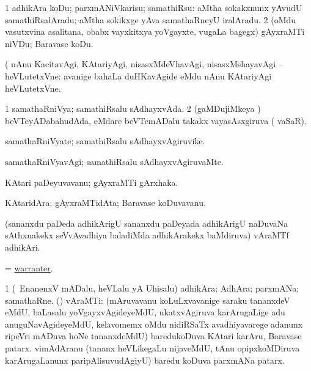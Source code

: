 \bentry
{} 
\gl{\sakirx}
\expl{}
\bmng
\bnum
\num{1} adhikAra koDu; parxmANiVkarisu; samathiRsu:  aMtha sokakxnunx yAvudU samathiRsalAradu; aMtha sokikxge yAva samathaRneyU iralAradu. 
\num{2} (oMdu vasutxvina asalitana, obabx vayxkitxya yoVgayxte, \mo vugaLa bagegx) gAyxraMTi niVDu; Baravase koDu. 
\enum
\emng

\noindent 
\gl{\pagu}
\expl{}
\bmng
{} (  nAnu KacitavAgi, KAtariyAgi, nisasxMdeVhavAgi, nisasxMshayavAgi -- heVLutetxVne:  avanige bahaLa duHKavAgide eMdu nAnu KAtariyAgi heVLutetxVne. 
\emng
\eentry

\bentry
{} 
\gl{\gu}
\expl{}
\bmng
\bnum
\num{1} samathaRniVya; samathiRsalu sAdhayxvAda. 
\num{2} (gaMDujiMkeya \vi) beVTeyADabahudAda, eMdare beVTemADalu takakx vayasAsxgiruva ( vaSaR). 
\enum
\emng
\eentry

\bentry
{} 
\gl{\nA}
\expl{}
\bmng
samathaRniVyate; samathiRsalu sAdhayxvAgiruvike. 
\emng
\eentry

\bentry
{} 
\gl{\kirxvi}
\expl{}
\bmng
samathaRniVyavAgi; samathiRsalu sAdhayxvAgiruvaMte. 
\emng
\eentry

\bentry
{} 
\gl{\nA}
\expl{}
\bmng
KAtari paDeyuvavanu; gAyxraMTi gArxhaka. 
\emng
\eentry

\bentry
{} 
\gl{\nA}
\expl{}
\bmng
KAtaridAra; gAyxraMTidAta; Baravase koDuvavanu. 
\emng
\eentry

\bentry
{} 
\gl{\nA}
\expl{}
\bmng
(sananxdu paDeda adhikArigU sananxdu paDeyada adhikArigU naDuvaNa sAthxnakekx seVvAvadhiya baladiMda adhikArakekx baMdiruva) vAraMTf adhikAri. 
\emng
\eentry

\bentry
{} 
\gl{\nA}
\expl{}
\bmng
= \hyperlink{warranter}{warranter}. 
\emng
\eentry

\bentry
{} 
\gl{\nA}
\bmng
\bnum
\num{1} (\sA\ EnanenxV mADalu, heVLalu yA Uhisalu) adhikAra; AdhAra; parxmANa; samathaRne. 
 (\nAyxshA) vAraMTi: 
\banum
{} (mAruvavanu koLuLxvavanige saraku tananxdeV eMdU, baLasalu yoVgayxvAgideyeMdU, ukatxvAgiruva karArugaLige adu anuguNavAgideyeMdU, kelavomemx oMdu nidiRSaTx avadhiyavarege adanunx ripeVri mADuva hoNe tananxdeMdU) baredukoDuva KAtari karAru, Baravase patarx. 
 vimAdAranu (tananx heVLikegaLu nijaveMdU, tAnu opipxkoMDiruva karArugaLanunx paripAlisuvudAgiyU) baredu koDuva parxmANa patarx. 
\eanum
\numie
\enum
\emng
\eentry

